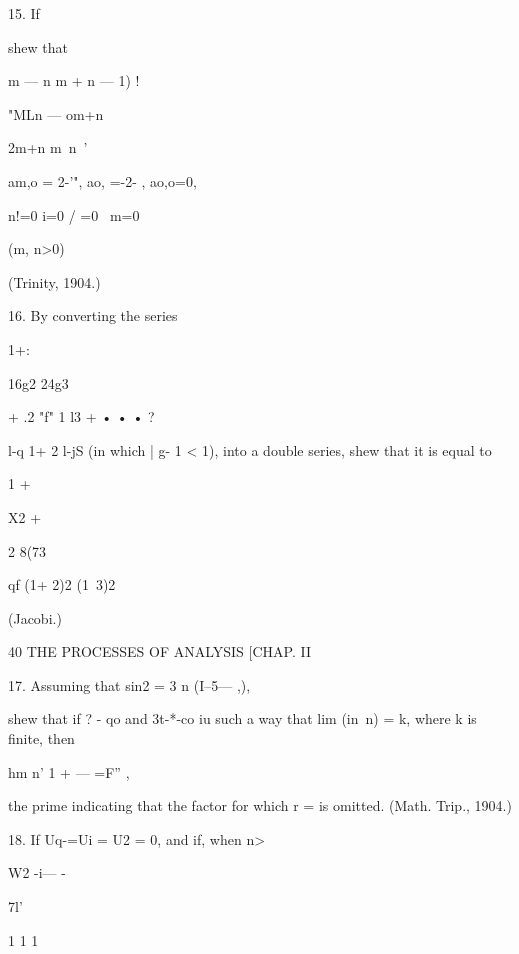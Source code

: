 15. If

shew that



m — n m + n — 1) !



"MLn — om+n



2m+n m\ n\ '

am,o = 2-'", ao, =-2- , ao,o=0,



n!=0 i=0 / =0 \ m=0



(m, n>0)



(Trinity, 1904.)



16. By converting the series

1+:



16g2 24g3

+ .2 "f" 1 l3 + • • • ?



l-q 1+ 2 l-jS (in which | g- 1 < 1), into a double series, shew that
it is equal to



1 +



X2 +



2 8(73



  qf (1+ 2)2 (1\ 3)2



(Jacobi.)



40 THE PROCESSES OF ANALYSIS [CHAP. II

17. Assuming that sin2 = 3 n (I--5— ,),

shew that if ? - qo and 3t-*-co iu such a way that lim (in\ n) = k,
where k is finite, then

hm n' 1 + — =F'' ,



the prime indicating that the factor for which r = is omitted. (Math.
Trip., 1904.)

18. If Uq-=Ui = U2 = 0, and if, when n>\,



W2 -i— -



 7l'



1 1 1

